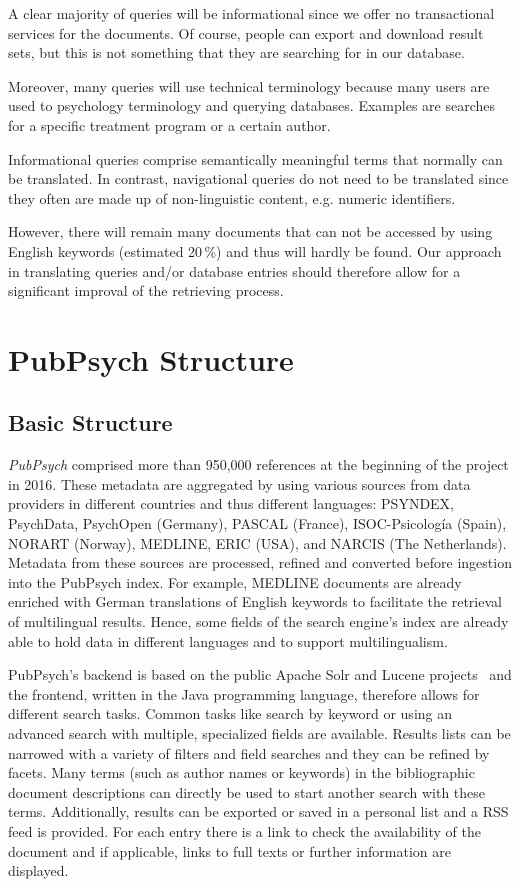\documentclass[a4paper,11pt]{article}
\begin{document}
A clear majority of queries will be informational since we offer no transactional services for the documents. Of course, people can export and download result sets, but this is not something that they are searching for in our database. 

Moreover, many queries will use technical terminology because many users are used to psychology terminology and querying databases. Examples are searches for a specific treatment program or a certain author.

Informational queries comprise semantically meaningful terms that normally can be translated. In contrast, navigational queries do not need to be translated since they often are made up of non-linguistic content, e.g. numeric identifiers.

However, there will remain many documents that can not be accessed by using English keywords (estimated 20\,\%) and thus will hardly be found. Our approach in translating queries and/or database entries should therefore allow for a significant improval of the retrieving process.


\section{PubPsych Structure}
\label{s:pubpsych_structure}
\subsection{Basic Structure}
\label{ss:pubStruc_basic}
\textit{PubPsych} comprised more than 950,000 references at the beginning of the project in 2016. These metadata are aggregated by using various sources from data providers in different countries and thus different languages: PSYNDEX, PsychData, PsychOpen (Germany), PASCAL (France), ISOC-Psicología (Spain), NORART (Norway), MEDLINE, ERIC (USA), and NARCIS (The Netherlands). Metadata from these sources are processed, refined and converted before ingestion into the PubPsych index. For example, MEDLINE documents are already enriched with German translations of English keywords to facilitate the retrieval of multilingual results. Hence, some fields of the search engine's index are already able to hold data in different languages and to support multilingualism.

PubPsych's backend is based on the public Apache Solr and Lucene projects~\cite{solr} and the frontend, written in the Java programming language, therefore allows for different search tasks. Common tasks like search by keyword or using an advanced search with multiple, specialized fields are available. Results lists can be narrowed with a variety of filters and field searches and they can be refined by facets. Many terms (such as author names or keywords) in the bibliographic document descriptions can directly be used to start another search with these terms. Additionally, results can be exported or saved in a personal list and a RSS feed is provided. For each entry there is a link to check the availability of the document and if applicable, links to full texts or further information are displayed.
\end{document}
